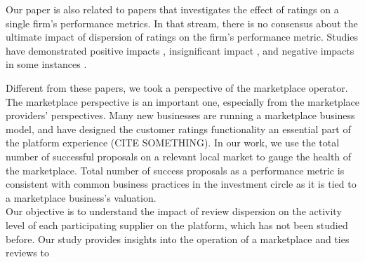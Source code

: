 \documentclass[msom,blindrev]{informs3}
\begin{document}
Our paper is also related to papers that investigates the effect of ratings on a single firm's performance metrics. In that stream, there is no consensus about the ultimate impact of dispersion of ratings on the firm's performance metric. Studies have demonstrated positive impacts \citep{chintagunta2010effects,chevalier2006effect,dellarocas2007exploring}, insignificant impact \citep{duan2008online}, and negative impacts in some instances \citep{wang2015user}.

Different from these papers, we took a perspective of the marketplace operator. The marketplace perspective is an important one, especially from the marketplace providers' perspectives. Many new businesses are running a marketplace business model, and have designed the customer ratings functionality an essential part of the platform experience (CITE SOMETHING). In our work, we use the total number of successful proposals on a relevant local market to gauge the health of the marketplace. Total number of success proposals as a performance metric is consistent with common business practices in the investment circle \citep{boris_2018,galston_2017} as it is tied to a marketplace business's valuation. \\

Our objective is to understand the impact of review dispersion on the activity level of each participating supplier on the platform, which has not been studied before. Our study provides insights into the operation of a marketplace and ties reviews to
\end{document}
